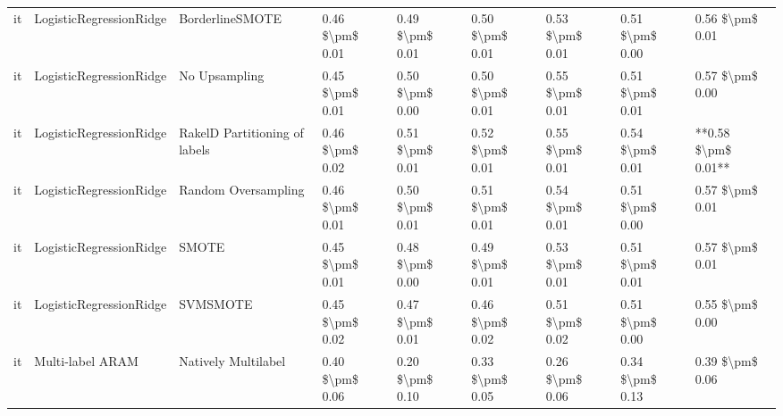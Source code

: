 \begin{tabular}{lllllllll}
      it &         LogisticRegressionRidge &               BorderlineSMOTE & 0.46 \$\textbackslash pm\$ 0.01 &           0.49 \$\textbackslash pm\$ 0.01 &       0.50 \$\textbackslash pm\$ 0.01 &        0.53 \$\textbackslash pm\$ 0.01 &                         0.51 \$\textbackslash pm\$ 0.00 &     0.56 \$\textbackslash pm\$ 0.01 \\
      it &         LogisticRegressionRidge &                 No Upsampling & 0.45 \$\textbackslash pm\$ 0.01 &           0.50 \$\textbackslash pm\$ 0.00 &       0.50 \$\textbackslash pm\$ 0.01 &        0.55 \$\textbackslash pm\$ 0.01 &                         0.51 \$\textbackslash pm\$ 0.01 &     0.57 \$\textbackslash pm\$ 0.00 \\
      it &         LogisticRegressionRidge & RakelD Partitioning of labels & 0.46 \$\textbackslash pm\$ 0.02 &           0.51 \$\textbackslash pm\$ 0.01 &       0.52 \$\textbackslash pm\$ 0.01 &        0.55 \$\textbackslash pm\$ 0.01 &                         0.54 \$\textbackslash pm\$ 0.01 & **0.58 \$\textbackslash pm\$ 0.01** \\
      it &         LogisticRegressionRidge &           Random Oversampling & 0.46 \$\textbackslash pm\$ 0.01 &           0.50 \$\textbackslash pm\$ 0.01 &       0.51 \$\textbackslash pm\$ 0.01 &        0.54 \$\textbackslash pm\$ 0.01 &                         0.51 \$\textbackslash pm\$ 0.00 &     0.57 \$\textbackslash pm\$ 0.01 \\
      it &         LogisticRegressionRidge &                         SMOTE & 0.45 \$\textbackslash pm\$ 0.01 &           0.48 \$\textbackslash pm\$ 0.00 &       0.49 \$\textbackslash pm\$ 0.01 &        0.53 \$\textbackslash pm\$ 0.01 &                         0.51 \$\textbackslash pm\$ 0.01 &     0.57 \$\textbackslash pm\$ 0.01 \\
      it &         LogisticRegressionRidge &                      SVMSMOTE & 0.45 \$\textbackslash pm\$ 0.02 &           0.47 \$\textbackslash pm\$ 0.01 &       0.46 \$\textbackslash pm\$ 0.02 &        0.51 \$\textbackslash pm\$ 0.02 &                         0.51 \$\textbackslash pm\$ 0.00 &     0.55 \$\textbackslash pm\$ 0.00 \\
      it &                Multi-label ARAM &           Natively Multilabel & 0.40 \$\textbackslash pm\$ 0.06 &           0.20 \$\textbackslash pm\$ 0.10 &       0.33 \$\textbackslash pm\$ 0.05 &        0.26 \$\textbackslash pm\$ 0.06 &                         0.34 \$\textbackslash pm\$ 0.13 &     0.39 \$\textbackslash pm\$ 0.06 \\

\end{tabular}
